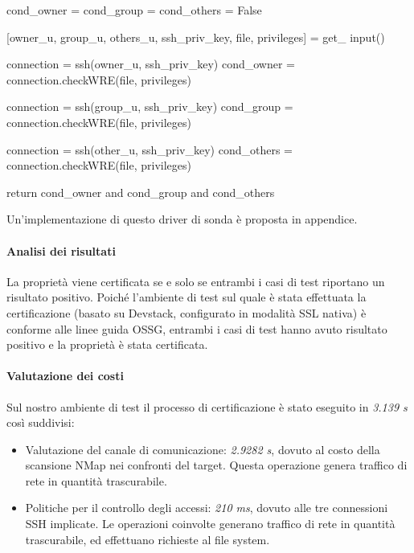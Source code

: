 \documentclass[../main.tex]{subfiles}
\begin{document}
\begin{itemize}
\begin{python}
cond_owner = cond_group = cond_others = False

[owner_u, group_u, others_u, ssh_priv_key, file, privileges] = get_ input()

connection = ssh(owner_u, ssh_priv_key)
cond_owner = connection.checkWRE(file, privileges)

connection = ssh(group_u, ssh_priv_key)
cond_group = connection.checkWRE(file, privileges)

connection = ssh(other_u, ssh_priv_key)
cond_others = connection.checkWRE(file, privileges)

return cond_owner and cond_group and cond_others
\end{python}

Un'implementazione di questo driver di sonda è proposta in appendice.

\end{itemize}
\paragraph{Analisi dei risultati}
La proprietà viene certificata se e solo se entrambi i casi di test riportano un risultato positivo.
Poiché l'ambiente di test sul quale è stata effettuata la certificazione (basato su Devstack, configurato in modalità SSL nativa) è conforme alle linee guida OSSG, entrambi i casi di test hanno avuto risultato positivo e la proprietà è stata certificata.

\paragraph{Valutazione dei costi}
Sul nostro ambiente di test il processo di certificazione è stato eseguito in \textit{3.139 s} così suddivisi:
\begin{itemize}
\item Valutazione del canale di comunicazione: \textit{2.9282 s}, dovuto al costo della scansione NMap nei confronti del target. Questa operazione genera traffico di rete in quantità trascurabile.
\item Politiche per il controllo degli accessi: \textit{210 ms}, dovuto alle tre connessioni SSH implicate. Le operazioni coinvolte generano traffico di rete in quantità trascurabile, ed effettuano richieste al file system.
\end{itemize}
\end{document}
